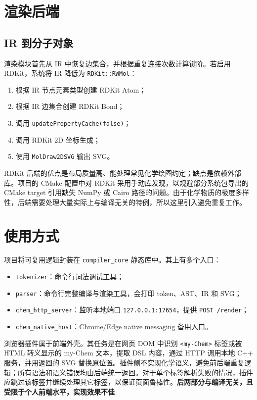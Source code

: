 \documentclass[UTF8,a4paper,11pt]{ctexart}
\begin{document}
\section{渲染后端}

\subsection{IR 到分子对象}

渲染模块首先从 IR 中恢复边集合，并根据重复连接次数计算键阶。若启用 RDKit，系统将 IR 降低为 \verb|RDKit::RWMol|：
\begin{enumerate}[leftmargin=2em]
  \item 根据 IR 节点元素类型创建 RDKit Atom；
  \item 根据 IR 边集合创建 RDKit Bond；
  \item 调用 \verb|updatePropertyCache(false)|；
  \item 调用 RDKit 2D 坐标生成；
  \item 使用 \verb|MolDraw2DSVG| 输出 SVG。
\end{enumerate}

RDKit 后端的优点是布局质量高、能处理常见化学绘图约定；缺点是依赖外部库。项目的 CMake 配置中对 RDKit 采用手动库发现，以规避部分系统包导出的 CMake target 引用缺失 NumPy 或 Cairo 路径的问题。由于化学物质的极度多样性，后端需要处理大量实际上与编译无关的特例，所以这里引入避免重复工作。

\section{使用方式}


项目将可复用逻辑封装在 \verb|compiler_core| 静态库中。其上有多个入口：
\begin{itemize}[leftmargin=2em]
  \item \verb|tokenizer|：命令行词法调试工具；
  \item \verb|parser|：命令行完整编译与渲染工具，会打印 token、AST、IR 和 SVG；
  \item \verb|chem_http_server|：监听本地端口 \verb|127.0.0.1:17654|，提供 \verb|POST /render|；
  \item \verb|chem_native_host|：Chrome/Edge native messaging 备用入口。
\end{itemize}

浏览器插件属于前端外壳。其任务是在网页 DOM 中识别 \verb|<my-Chem>| 标签或被 HTML 转义显示的 my-Chem 文本，提取 DSL 内容，通过 HTTP 调用本地 C++ 服务，并用返回的 SVG 替换原位置。插件侧不实现化学语义，避免前后端重复逻辑；所有语法和语义错误均由后端统一返回。对于单个标签解析失败的情况，插件应跳过该标签并继续处理其它标签，以保证页面鲁棒性。\textbf{后两部分与编译无关，且受限于个人前端水平，实现效果不佳}
\end{document}
